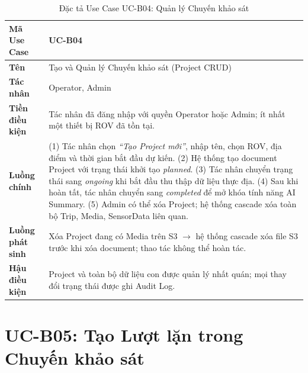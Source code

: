 \documentclass[../DoAn.tex]{subfiles}
\begin{document}
\begin{longtable}{|p{3.5cm}|p{10.0cm}|}
\caption{Đặc tả Use Case UC-B04: Quản lý Chuyến khảo sát}\label{tab:ucb04}\\
\hline
\textbf{Mã Use Case} & UC-B04 \\
\hline
\textbf{Tên} & Tạo và Quản lý Chuyến khảo sát (Project CRUD) \\
\hline
\textbf{Tác nhân} & Operator, Admin \\
\hline
\textbf{Tiền điều kiện} & Tác nhân đã đăng nhập với quyền Operator hoặc Admin; ít nhất một thiết bị ROV đã tồn tại. \\
\hline
\textbf{Luồng chính} &
(1) Tác nhân chọn \textit{``Tạo Project mới''}, nhập tên, chọn ROV, địa điểm và thời gian bắt đầu dự kiến. \newline
(2) Hệ thống tạo document Project với trạng thái khởi tạo \textit{planned}. \newline
(3) Tác nhân chuyển trạng thái sang \textit{ongoing} khi bắt đầu thu thập dữ liệu thực địa. \newline
(4) Sau khi hoàn tất, tác nhân chuyển sang \textit{completed} để mở khóa tính năng AI Summary. \newline
(5) Admin có thể xóa Project; hệ thống cascade xóa toàn bộ Trip, Media, SensorData liên quan. \\
\hline
\textbf{Luồng phát sinh} & Xóa Project đang có Media trên S3 $\to$ hệ thống cascade xóa file S3 trước khi xóa document; thao tác không thể hoàn tác. \\
\hline
\textbf{Hậu điều kiện} & Project và toàn bộ dữ liệu con được quản lý nhất quán; mọi thay đổi trạng thái được ghi Audit Log. \\
\hline
\end{longtable}

\section{UC-B05: Tạo Lượt lặn trong Chuyến khảo sát}
\end{document}
